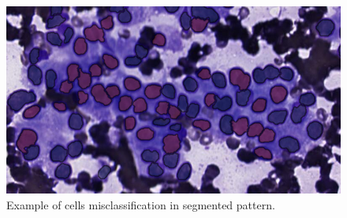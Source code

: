 \begin{figure}
{	}
	\caption{}
	\label{fig:failing_detection}
\end{figure}

\begin{figure}
	\center
	\includegraphics[scale=0.6]{image/second_seg_fail_classif.png}
	\caption{Example of cells misclassification in segmented pattern.}
	\label{fig:ex_failing_classif_pattern}
\end{figure}

